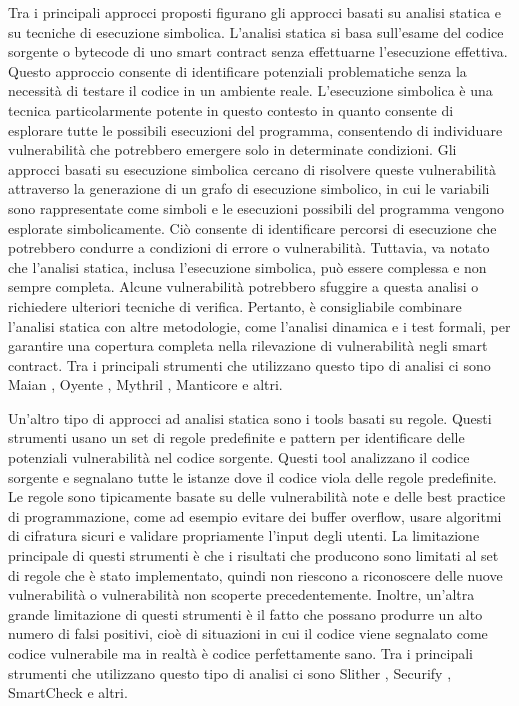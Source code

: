 \documentclass[../../Thesis.tex]{subfiles}
\begin{document}
Tra i principali approcci proposti figurano gli approcci basati su analisi statica e su tecniche di esecuzione simbolica. L'analisi statica si basa sull'esame del codice sorgente o bytecode di uno smart contract senza effettuarne l'esecuzione effettiva. Questo approccio consente di identificare potenziali problematiche senza la necessit\`a di testare il codice in un ambiente reale. L'esecuzione simbolica \`e una tecnica particolarmente potente in questo contesto in quanto consente di esplorare tutte le possibili esecuzioni del programma, consentendo di individuare vulnerabilit\`a che potrebbero emergere solo in determinate condizioni.
Gli approcci basati su esecuzione simbolica cercano di risolvere queste vulnerabilit\`a attraverso la generazione di un grafo di esecuzione simbolico, in cui le variabili sono rappresentate come simboli e le esecuzioni possibili del programma vengono esplorate simbolicamente. Ci\`o consente di identificare percorsi di esecuzione che potrebbero condurre a condizioni di errore o vulnerabilit\`a.
Tuttavia, va notato che l'analisi statica, inclusa l'esecuzione simbolica, pu\`o essere complessa e non sempre completa. Alcune vulnerabilit\`a potrebbero sfuggire a questa analisi o richiedere ulteriori tecniche di verifica. Pertanto, \`e consigliabile combinare l'analisi statica con altre metodologie, come l'analisi dinamica e i test formali, per garantire una copertura completa nella rilevazione di vulnerabilit\`a negli smart contract. Tra i principali strumenti che utilizzano questo tipo di analisi ci sono Maian \cite{Maian, Maian2}, Oyente \cite{Oyente, Oyente2}, Mythril \cite{Mythril}, Manticore \cite{Manticore} e altri.

Un'altro tipo di approcci ad analisi statica sono i tools basati su regole. Questi strumenti usano un set di regole predefinite e pattern per identificare delle potenziali vulnerabilit\`a nel codice sorgente. Questi tool analizzano il codice sorgente e segnalano tutte le istanze dove il codice viola delle regole predefinite. Le regole sono tipicamente basate su delle vulnerabilit\`a note e delle best practice di programmazione, come ad esempio evitare dei buffer overflow, usare algoritmi di cifratura sicuri e validare propriamente l'input degli utenti. La limitazione principale di questi strumenti \`e che i risultati che producono sono limitati al set di regole che \`e stato implementato, quindi non riescono a riconoscere delle nuove vulnerabilit\`a o vulnerabilit\`a non scoperte precedentemente. Inoltre, un'altra grande limitazione di questi strumenti \`e il fatto che possano produrre un alto numero di falsi positivi, cio\`e di situazioni in cui il codice viene segnalato come codice vulnerabile ma in realt\`a \`e codice perfettamente sano. Tra i principali strumenti che utilizzano questo tipo di analisi ci sono Slither \cite{Slither}, Securify \cite{Securify}, SmartCheck \cite{SmartCheck} e altri.
\end{document}
